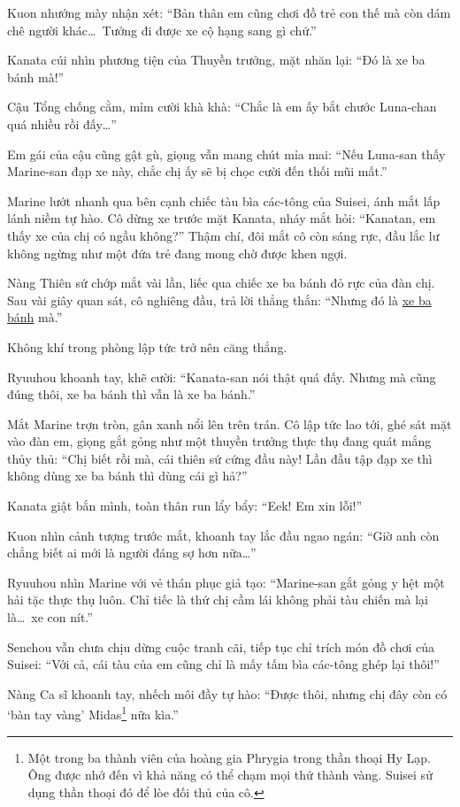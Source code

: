 \documentclass[../main.tex]{subfiles}
\begin{document}
Kuon nhướng mày nhận xét: ``Bản thân em cũng chơi đồ trẻ con thế mà còn dám chê người khác\dots\ Tưởng đi được xe cộ hạng sang gì chứ.''

Kanata cúi nhìn phương tiện của Thuyền trưởng, mặt nhăn lại: ``Đó là xe ba bánh mà!''

Cậu Tổng chống cằm, mỉm cười khà khà: ``Chắc là em ấy bắt chước Luna-chan quá nhiều rồi đấy\dots''

Em gái của cậu cũng gật gù, giọng vẫn mang chút mỉa mai: ``Nếu Luna-san thấy Marine-san đạp xe này, chắc chị ấy sẽ bị chọc cười đến thối mũi mất.''

Marine lướt nhanh qua bên cạnh chiếc tàu bìa các-tông của Suisei, ánh mắt lấp lánh niềm tự hào. Cô dừng xe trước mặt Kanata, nháy mắt hỏi: ``Kanatan, em thấy xe của chị có ngầu không?'' Thậm chí, đôi mắt cô còn sáng rực, đầu lắc lư không ngừng như một đứa trẻ đang mong chờ được khen ngợi.

Nàng Thiên sứ chớp mắt vài lần, liếc qua chiếc xe ba bánh đỏ rực của đàn chị. Sau vài giây quan sát, cô nghiêng đầu, trả lời thẳng thắn: ``Nhưng đó là \uline{xe ba bánh} mà.''

Không khí trong phòng lập tức trở nên căng thẳng.

Ryuuhou khoanh tay, khẽ cười: ``Kanata-san nói thật quá đấy. Nhưng mà cũng đúng thôi, xe ba bánh thì vẫn là xe ba bánh.''

Mắt Marine trợn tròn, gân xanh nổi lên trên trán. Cô lập tức lao tới, ghé sát mặt vào đàn em, giọng gắt gỏng như một thuyền trưởng thực thụ đang quát mắng thủy thủ: ``Chị biết rồi mà, cái thiên sứ cứng đầu này! Lần đầu tập đạp xe thì không dùng xe ba bánh thì dùng cái gì hả?''


Kanata giật bắn mình, toàn thân run lẩy bẩy: ``Eek! Em xin lỗi!''

Kuon nhìn cảnh tượng trước mắt, khoanh tay lắc đầu ngao ngán: ``Giờ anh còn chẳng biết ai mới là người đáng sợ hơn nữa\dots''

Ryuuhou nhìn Marine với vẻ thán phục giả tạo: ``Marine-san gắt gỏng y hệt một hải tặc thực thụ luôn. Chỉ tiếc là thứ chị cầm lái không phải tàu chiến mà lại là\dots\ xe con nít.''

Senchou vẫn chưa chịu dừng cuộc tranh cãi, tiếp tục chỉ trích món đồ chơi của Suisei: ``Với cả, cái tàu của em cũng chỉ là mấy tấm bìa các-tông ghép lại thôi!''

Nàng Ca sĩ khoanh tay, nhếch môi đầy tự hào: ``Được thôi, nhưng chị đây còn có `bàn tay vàng' Midas\footnote{Một trong ba thành viên của hoàng gia Phrygia trong thần thoại Hy Lạp. Ông được nhớ đến vì khả năng có thể chạm mọi thứ thành vàng. Suisei sử dụng thần thoại đó để lòe đối thủ của cô.} nữa kìa.''
\end{document}
